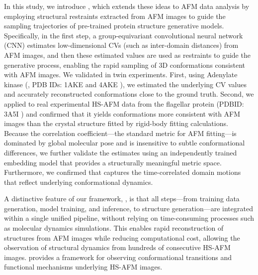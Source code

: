 In this study, we introduce \Model, which extends these ideas to AFM data analysis by employing structural restraints extracted from AFM images to guide the sampling trajectories of pre-trained protein structure generative models. Specifically, in the first step, a group-equivariant convolutional neural network (CNN) \cite{e2cnn} estimates low-dimensional CVs (such as inter-domain distances) from AFM images, and then these estimated values are used as restraints to guide the generative process, enabling the rapid sampling of 3D conformations consistent with AFM images. We validated \Model in twin experiments. First, using Adenylate kinase (\AK, PDB IDs: 1AKE \cite{muller1992adenylate} and 4AKE \cite{muller1996adenylate}), we estimated the underlying CV values and accurately reconstructed conformations close to the ground truth.
Second, we applied \Model to real experimental HS-AFM data from the flagellar protein \flhac (PDBID: 3A5I \cite{saijo-hamano2010flha}) and 
confirmed that it yields conformations more consistent with AFM images than the crystal structure fitted by rigid-body fitting calculations.
Because the correlation coefficient---the standard metric for AFM fitting---is dominated by global molecular pose and is insensitive to subtle conformational differences, we further validate the estimates using an independently trained embedding model that provides a structurally meaningful metric space.
Furthermore, we confirmed that \Model captures the time-correlated domain motions that reflect underlying conformational dynamics.

A distinctive feature of our framework, \Model, is that all steps—from training data generation, model training, and inference, to structure generation—are integrated within a single unified pipeline, without relying on time-consuming processes such as molecular dynamics simulations. 
This enables rapid reconstruction of structures from AFM images while reducing computational cost, allowing the observation of structural dynamics from hundreds of consecutive HS-AFM images. \Model provides a framework for observing conformational transitions and functional mechanisms underlying HS-AFM images.

